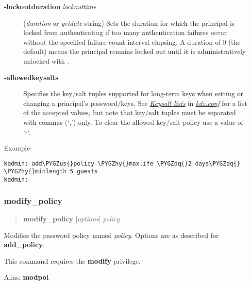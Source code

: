 \documentclass[letterpaper,10pt,english]{sphinxmanual}
\def\PYGZus{\char`\_}
\def\PYGZhy{\char`\-}
\def\PYGZdq{\char`\"}
\begin{document}
\label{admin/admin_commands/kadmin_local:policy-lockoutduration}\begin{description}
\item[{\textbf{-lockoutduration} \emph{lockouttime}}] \leavevmode
(\emph{duration} or \emph{getdate} string) Sets the duration for
which the principal is locked from authenticating if too many
authentication failures occur without the specified failure count
interval elapsing.  A duration of 0 (the default) means the
principal remains locked out until it is administratively unlocked
with .

\item[{\textbf{-allowedkeysalts}}] \leavevmode
Specifies the key/salt tuples supported for long-term keys when
setting or changing a principal's password/keys.  See
{\hyperref[admin/conf_files/kdc_conf:keysalt-lists]{\emph{Keysalt lists}}} in {\hyperref[admin/conf_files/kdc_conf:kdc-conf-5]{\emph{kdc.conf}}} for a list of the
accepted values, but note that key/salt tuples must be separated
with commas (`,') only.  To clear the allowed key/salt policy use
a value of `-`.

\end{description}

Example:

\begin{Verbatim}[commandchars=\\\{\}]
kadmin: add\PYGZus{}policy \PYGZhy{}maxlife \PYGZdq{}2 days\PYGZdq{} \PYGZhy{}minlength 5 guests
kadmin:
\end{Verbatim}
\label{admin/admin_commands/kadmin_local:add-policy-end}

\subsubsection{modify\_policy}
\label{admin/admin_commands/kadmin_local:id13}\label{admin/admin_commands/kadmin_local:modify-policy}\label{admin/admin_commands/kadmin_local:add-policy-end}\begin{quote}

\textbf{modify\_policy} {[}\emph{options}{]} \emph{policy}
\end{quote}

Modifies the password policy named \emph{policy}.  Options are as described
for \textbf{add\_policy}.

This command requires the \textbf{modify} privilege.

Alias: \textbf{modpol}
\label{admin/admin_commands/kadmin_local:modify-policy-end}
\end{document}
